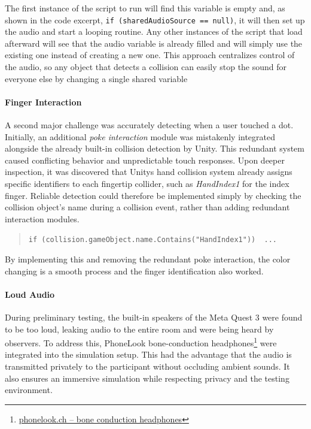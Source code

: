 The first instance of the script to run will find this variable is empty and, as shown in the code excerpt, \texttt{if (sharedAudioSource == null)}, it will then set up the audio and start a looping routine. Any other instances of the script that load afterward will see that the audio variable is already filled and will simply use the existing one instead of creating a new one. This approach centralizes control of the audio, so any object that detects a collision can easily stop the sound for everyone else by changing a single shared variable

\paragraph{Finger Interaction} 
A second major challenge was accurately detecting when a user touched a dot. Initially, an additional \textit{poke interaction} module was mistakenly integrated alongside the already built-in collision detection by Unity. This redundant system caused conflicting behavior and unpredictable touch responses. Upon deeper inspection, it was discovered that Unitys hand collision system already assigns specific identifiers to each fingertip collider, such as \textit{HandIndex1} for the index finger. Reliable detection could therefore be implemented simply by checking the collision object's name during a collision event, rather than adding redundant interaction modules.

\begin{quote} \small \texttt{if (collision.gameObject.name.Contains("HandIndex1")) { ... }} \end{quote}

By implementing this and removing the redundant poke interaction, the color changing is a smooth process and the finger identification also worked.

\paragraph{Loud Audio} 
During preliminary testing, the built-in speakers of the Meta Quest 3 were found to be too loud, leaking audio to the entire room and were being heard by observers. To address this, PhoneLook bone-conduction headphones\footnote{\href{https://www.phonelook.ch/de/stylische-kabellose-bluetooth-knochenleitungs-kopfhorer-fur-sport-laufen-radfahren-fitness-schwarz.html}{phonelook.ch – bone conduction headphones}} were integrated into the simulation setup. This had the advantage that the audio is transmitted privately to the participant without occluding ambient sounds.
It also ensures an immersive simulation while respecting privacy and the testing environment.


